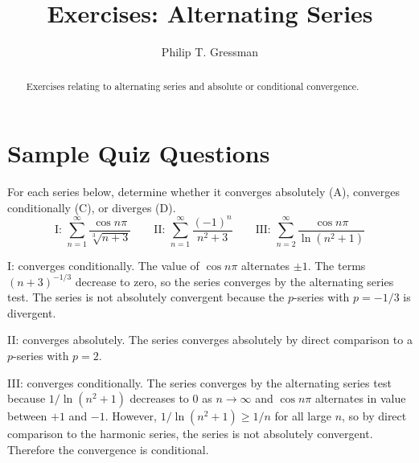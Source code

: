 \documentclass{ximera}
\title{Exercises: Alternating Series}
\author{Philip T. Gressman}
\begin{document}
\begin{abstract}
Exercises relating to alternating series and absolute or conditional convergence.
\end{abstract}
\maketitle


\section*{Sample Quiz Questions}

\begin{question}%

For each series below, determine whether it converges absolutely (A), converges conditionally (C), or diverges (D).  \[\text{I: } \sum_{n = 1}^\infty\frac{\cos n \pi}{\sqrt[3]{n+3}} \qquad \text{II: } \sum_{n = 1}^\infty\frac{(-1)^n}{n^2+3} \qquad \text{III: } \sum_{n = 2}^\infty\frac{\cos n \pi}{\ln (n^2 + 1)}\]
\begin{multiplechoice}
\end{multiplechoice}
\begin{feedback}
I: converges conditionally. The value of \(\cos n \pi\) alternates \(\pm 1\). The terms \((n+3)^{-1/3}\) decrease to zero, so the series converges by the alternating series test. The series is not absolutely convergent because the \(p\)-series with \(p = -1/3\) is divergent.

II: converges absolutely. The series converges absolutely by direct comparison to a \(p\)-series with \(p=2\).

III: converges conditionally. The series converges by the alternating series test because \(1/\ln (n^2+1)\) decreases to \(0\) as \(n \rightarrow \infty\) and \(\cos n \pi\) alternates in value between \(+1\) and \(-1\). However, \(1/\ln (n^2+1) \geq 1/n\) for all large \(n\), so by direct comparison to the harmonic series, the series is not absolutely convergent. Therefore the convergence is conditional.
\end{feedback}

\end{question}
\end{document}
